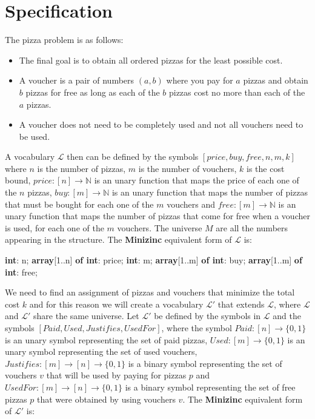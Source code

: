 \documentclass[conference]{IEEEtran}
\newcommand\tab[1][0.3cm]{\hspace*{#1}}
\begin{document}
\section{Specification}
The pizza problem is as follows:
\begin{itemize}
\item The final goal is to obtain all ordered pizzas for the least possible cost.
\item A voucher is a pair of numbers $(a, b)$ where you pay for $a$ pizzas and obtain $b$ pizzas for free as long as each of the $b$ pizzas cost no more than each of the $a$ pizzas.
\item A voucher does not need to be completely used and not all vouchers need to be used.
\end{itemize}
\tab A vocabulary $\mathcal{L}$ then can be defined by the symbols $[ price, buy, free, n, m, k ]$ where $n$ is the number of pizzas, $m$ is the number of vouchers, $k$ is the cost bound, $price : [n] \rightarrow \mathbb{N}$ is an unary function that maps the price of each one of the $n$ pizzas, $buy : [m] \rightarrow \mathbb{N}$ is an unary function that maps the number of pizzas that must be bought for each one of the $m$ vouchers and $free : [m] \rightarrow \mathbb{N}$ is an unary function that maps the number of pizzas that come for free when a voucher is used, for each one of the $m$ vouchers. The universe $M$ are all the numbers appearing in the structure. The \textbf{Minizinc} equivalent form of $\mathcal{L}$ is:
\begin{algorithmic}
\State \textbf{int}: n;
\State \textbf{array}[1..n] \textbf{of int}: price;
\State \textbf{int}: m;
\State \textbf{array}[1..m] \textbf{of int}: buy;
\State \textbf{array}[1..m] \textbf{of int}: free;
\\
\end{algorithmic}
\tab We need to find an assignment of pizzas and vouchers that minimize the total cost $k$ and for this reason we will create a vocabulary $\mathcal{L'}$ that extends $\mathcal{L}$, where $\mathcal{L}$  and $\mathcal{L'}$ share the same universe. Let $\mathcal{L'}$ be defined by the symbols in $\mathcal{L}$ and the symbols $[ Paid, Used, Justifies, UsedFor ]$, where the symbol $Paid : [n] \rightarrow \{ 0, 1\}$ is an unary symbol representing the set of paid pizzas, $Used: [m] \rightarrow \{ 0, 1\}$ is an unary symbol representing the set of used vouchers, $Justifies: [m] \rightarrow [n] \rightarrow \{ 0, 1\}$ is a binary symbol representing the set of vouchers $v$ that will be used by paying for pizzas $p$ and $UsedFor: [m] \rightarrow [n] \rightarrow \{ 0, 1\}$ is a binary symbol representing the set of free pizzas $p$ that were obtained by using vouchers $v$. The \textbf{Minizinc} equivalent form of $\mathcal{L'}$ is:
\end{document}

